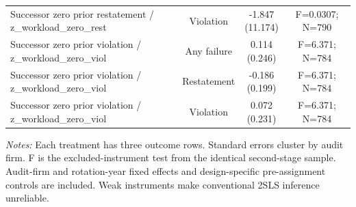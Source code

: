 \documentclass[10pt]{article}
\begin{document}
\begin{minipage}{19cm}
\begin{threeparttable}
\begin{tabular}{p{}ccc}
Successor zero prior restatement / z\_workload\_zero\_rest & Violation & \shortstack{-1.847\\(11.174)} & F=0.0307; N=790 \\
Successor zero prior violation / z\_workload\_zero\_viol & Any failure & \shortstack{0.114\\(0.246)} & F=6.371; N=784 \\
Successor zero prior violation / z\_workload\_zero\_viol & Restatement & \shortstack{-0.186\\(0.199)} & F=6.371; N=784 \\
Successor zero prior violation / z\_workload\_zero\_viol & Violation & \shortstack{0.072\\(0.231)} & F=6.371; N=784 \\
\bottomrule
\end{tabular}
\begin{tablenotes}\fontsize{9}{11}\selectfont
\item \raggedright \fontsize{9}{11}\selectfont \textit{Notes:} Each treatment has three outcome rows. Standard errors cluster by audit firm. F is the excluded-instrument test from the identical second-stage sample. Audit-firm and rotation-year fixed effects and design-specific pre-assignment controls are included. Weak instruments make conventional 2SLS inference unreliable.
\end{tablenotes}
\end{threeparttable}

\end{minipage}
\end{document}
